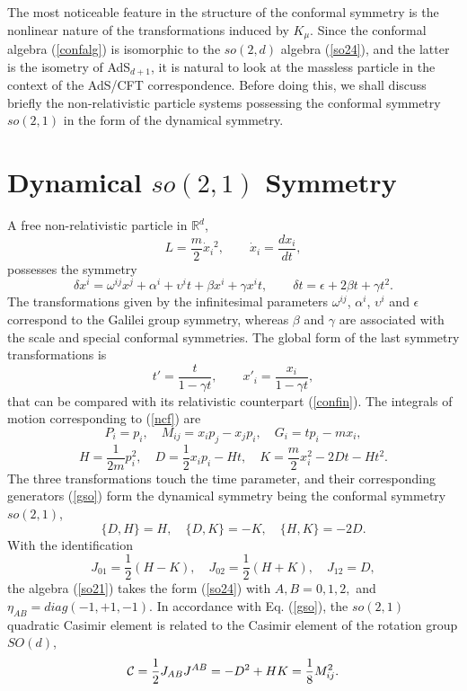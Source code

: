 \documentclass[a4paper,12pt]{article}
\def\R{\mathbb R}
\begin{document}
The most noticeable feature
in the structure of the
conformal symmetry
is the nonlinear nature of the
transformations
induced by $K_\mu$.
Since the conformal algebra (\ref{confalg})
is isomorphic to the $so(2,d)$ algebra
(\ref{so24}), and
the latter is the
isometry of AdS${}_{d+1}$,
it is natural to
look at the massless particle
in the context of the AdS/CFT
correspondence.
Before doing this, we shall discuss
briefly the non-relativistic
particle systems possessing the conformal symmetry
$so(2,1)$ in the form of the
dynamical symmetry.


\section{Dynamical $so(2,1)$ Symmetry}

A
free non-relativistic particle
in $\R^d$,
\begin{equation}
L=\frac{m}{2}\dot{x}_i{}^2,\qquad \dot{x}_i=\frac{dx_i}{dt},
\label{mnr}
\end{equation}
possesses the symmetry
\begin{equation}
\delta x^i= \omega^{ij}x^j+\alpha^i+
\upsilon^i t+\beta x^i+\gamma x^i t,\qquad
\delta t=\epsilon + 2\beta t +\gamma t^2.
\label{ncf}
\end{equation}
The transformations given by
the infinitesimal parameters
$\omega^{ij}$,
$\alpha^i$,
$\upsilon^i$ and
$\epsilon$
correspond to the Galilei group symmetry,
whereas
$\beta$ and $\gamma$
are associated with
the scale and special conformal
symmetries. The global form of the
last symmetry transformations is
\[
t'=\frac{t}{1-\gamma t},
\qquad
x'_i=\frac{x_i}{1-\gamma t},
\]
that can be compared with its relativistic
counterpart (\ref{confin}).
The
integrals of motion
corresponding to (\ref{ncf})
are
\begin{equation}
P_i=p_i,\quad
M_{ij}=x_ip_j-x_jp_i,\quad
G_i=tp_i-mx_i,
\label{galilei}
\end{equation}
\begin{equation}
H=\frac{1}{2m} p_i^2,\quad
D=\frac{1}{2}x_ip_i-Ht,\quad
K=\frac{m}{2}x_i^2 -2Dt -Ht^2.
\label{gso}
\end{equation}
The three transformations touch the
time parameter, and their corresponding
generators
(\ref{gso})
form the dynamical symmetry
being the conformal symmetry $so(2,1)$,
\begin{equation}
\{D,H\}=H,\quad
\{D,K\}=-K,\quad
\{H,K\}=-2D.
\label{so21}
\end{equation}
With the identification
$$
J_{01}=\frac{1}{2}(H-K),\quad
J_{02}=\frac{1}{2}(H+K),\quad
J_{12}=D,
$$
the algebra (\ref{so21}) takes the form (\ref{so24})
with $A,B=0,1,2,$  and
$\eta_{AB}=diag (-1,+1,-1)$.
In accordance with Eq. (\ref{gso}),
the $so(2,1)$ quadratic Casimir element is
related to the Casimir element of the rotation
group $SO(d)$,
\begin{equation}
{\cal C}=\frac{1}{2}J_{AB}J^{AB}=-D^2+HK=\frac{1}{8}
M_{ij}^2.
\label{casimir}
\end{equation}
\end{document}
